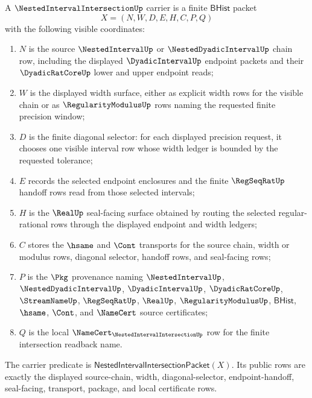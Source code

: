 \begin{definition}
\label{def:nested-interval-intersection-carrier}
A $\NestedIntervalIntersectionUp$ carrier is a finite $\mathsf{BHist}$ packet
$$
X=(N,W,D,E,H,C,P,Q)
$$
with the following visible coordinates:
\begin{enumerate}
\item $N$ is the source $\NestedIntervalUp$ or $\NestedDyadicIntervalUp$ chain row, including the displayed $\DyadicIntervalUp$ endpoint packets and their $\DyadicRatCoreUp$ lower and upper endpoint reads;
\item $W$ is the displayed width surface, either as explicit width rows for the visible chain or as $\RegularityModulusUp$ rows naming the requested finite precision window;
\item $D$ is the finite diagonal selector: for each displayed precision request, it chooses one visible interval row whose width ledger is bounded by the requested tolerance;
\item $E$ records the selected endpoint enclosures and the finite $\RegSeqRatUp$ handoff rows read from those selected intervals;
\item $H$ is the $\RealUp$ seal-facing surface obtained by routing the selected regular-rational rows through the displayed endpoint and width ledgers;
\item $C$ stores the $\hsame$ and $\Cont$ transports for the source chain, width or modulus rows, diagonal selector, handoff rows, and seal-facing rows;
\item $P$ is the $\Pkg$ provenance naming $\NestedIntervalUp$, $\NestedDyadicIntervalUp$, $\DyadicIntervalUp$, $\DyadicRatCoreUp$, $\StreamNameUp$, $\RegSeqRatUp$, $\RealUp$, $\RegularityModulusUp$, $\mathsf{BHist}$, $\hsame$, $\Cont$, and $\NameCert$ source certificates;
\item $Q$ is the local $\NameCert_{\NestedIntervalIntersectionUp}$ row for the finite intersection readback name.
\end{enumerate}
The carrier predicate is $\mathsf{NestedIntervalIntersectionPacket}(X)$. Its public rows are exactly the displayed source-chain, width, diagonal-selector, endpoint-handoff, seal-facing, transport, package, and local certificate rows.
\end{definition}

